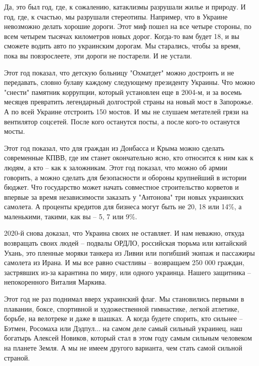 Да, это был год, где, к сожалению, катаклизмы разрушали жилье и природу. И
год, где, к счастью, мы разрушали стереотипы. Например, что в Украине
невозможно делать хорошие дороги. Этот миф пошел на все четыре стороны, по
всем четырем тысячах километров новых дорог. Когда-то вам будет 18, и вы
сможете водить авто по украинским дорогам. Мы старались, чтобы за время,
пока вы повзрослеете, эти дороги не постарели. И не устали.

Этот год показал, что детскую больницу "Охматдет" можно достроить и не
передавать, словно булаву каждому следующему президенту Украины. Что можно
"снести" памятник коррупции, который установлен еще в 2004-м, и за восемь
месяцев превратить легендарный долгострой страны на новый мост в
Запорожье. А по всей Украине отстроить 150 мостов. И мы не слушаем
метателей грязи на вентилятор соцсетей. После кого останутся посты, а
после кого-то останутся мосты.

Этот год показал, что для граждан из Донбасса и Крыма можно сделать
современные КПВВ, где им станет окончательно ясно, кто относится к ним как
к людям, а кто – как к заложникам. Этот год показал, что можно об армии
говорить, а можно сделать для безопасности и обороны крупнейший в истории
бюджет. Что государство может начать совместное строительство корветов и
впервые за время независимости заказать у "Антонова" три новых украинских
самолета. А проценты кредитов для бизнеса могут быть не 20, 18 или 14\%, а
маленькими, такими, как вы – 5, 7 или 9\%.

2020-й снова доказал, что Украина своих не оставляет. И нам неважно, откуда
возвращать своих людей – подвалы ОРДЛО, российская тюрьма или китайский Ухань,
это пленные моряки танкера из Ливии или погибший экипаж и пассажиры самолета из
Ирана. И мы все равно счастливы – возвращаем 250 000 граждан, застрявших из-за
карантина по миру, или одного украинца. Нашего защитника – непокоренного
Виталия Маркива.

Этот год не раз поднимал вверх украинский флаг. Мы становились первыми в
плавании, боксе, спортивной и художественной гимнастике, легкой атлетике,
борьбе, на велотреке и даже в шашках. А когда будете спорить, кто сильнее –
Бэтмен, Росомаха или Дэдпул... на самом деле самый сильный украинец, наш
богатырь Алексей Новиков, который стал в этом году самым сильным человеком на
планете Земля. А мы не имеем другого варианта, чем стать самой сильной страной.

